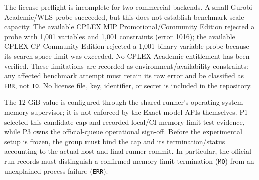 The license preflight is incomplete for two commercial backends. A small Gurobi Academic/WLS probe succeeded, but this does not establish benchmark-scale capacity. The available CPLEX MIP Promotional/Community Edition rejected a probe with 1,001 variables and 1,001 constraints (error 1016); the available CPLEX CP Community Edition rejected a 1,001-binary-variable probe because its search-space limit was exceeded. No CPLEX Academic entitlement has been verified. These limitations are recorded as environment/availability constraints: any affected benchmark attempt must retain its raw error and be classified as \texttt{ERR}, not \texttt{TO}. No license file, key, identifier, or secret is included in the repository.

The 12-GiB value is configured through the shared runner's operating-system memory supervisor; it is not enforced by the Exact model APIs themselves. P1 selected this candidate cap and recorded local/CI memory-limit test evidence, while P3 owns the official-queue operational sign-off. Before the experimental setup is frozen, the group must bind the cap and its termination/status accounting to the actual host and final runner commit. In particular, the official run records must distinguish a confirmed memory-limit termination (\texttt{MO}) from an unexplained process failure (\texttt{ERR}).
